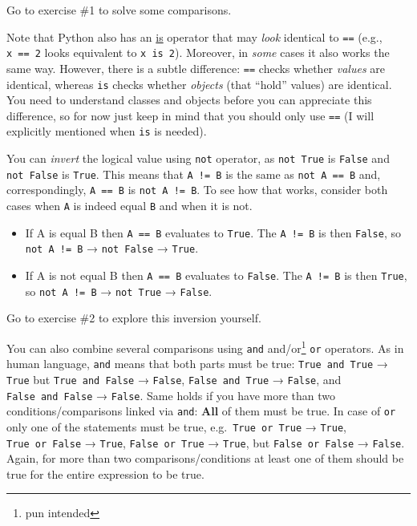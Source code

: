 \documentclass[
]{book}
\providecommand{\tightlist}{%
  \setlength{\itemsep}{0pt}\setlength{\parskip}{0pt}}
\begin{document}
Go to exercise \#1 to solve some comparisons.

Note that Python also has an \href{https://docs.python.org/3/library/operator.html\#operator.is_}{is} operator that may \emph{look} identical to \texttt{==} (e.g., \texttt{x\ ==\ 2} looks equivalent to \texttt{x\ is\ 2}). Moreover, in \emph{some} cases it also works the same way. However, there is a subtle difference: \texttt{==} checks whether \emph{values} are identical, whereas \texttt{is} checks whether \emph{objects} (that ``hold'' values) are identical. You need to understand classes and objects before you can appreciate this difference, so for now just keep in mind that you should only use \texttt{==} (I will explicitly mentioned when \texttt{is} is needed).

You can \emph{invert} the logical value using \texttt{not} operator, as \texttt{not\ True} is \texttt{False} and \texttt{not\ False} is \texttt{True}. This means that \texttt{A\ !=\ B} is the same as \texttt{not\ A\ ==\ B} and, correspondingly, \texttt{A\ ==\ B} is \texttt{not\ A\ !=\ B}. To see how that works, consider both cases when \texttt{A} is indeed equal \texttt{B} and when it is not.

\begin{itemize}
\tightlist
\item
  If A is equal B then \texttt{A\ ==\ B} evaluates to \texttt{True}. The \texttt{A\ !=\ B} is then \texttt{False}, so \texttt{not\ A\ !=\ B} → \texttt{not\ False} → \texttt{True}.
\item
  If A is not equal B then \texttt{A\ ==\ B} evaluates to \texttt{False}. The \texttt{A\ !=\ B} is then \texttt{True}, so \texttt{not\ A\ !=\ B} → \texttt{not\ True} → \texttt{False}.
\end{itemize}

Go to exercise \#2 to explore this inversion yourself.

You can also combine several comparisons using \texttt{and} and/or\footnote{pun intended} \texttt{or} operators. As in human language, \texttt{and} means that both parts must be true: \texttt{True\ and\ True} → \texttt{True} but \texttt{True\ and\ False} → \texttt{False}, \texttt{False\ and\ True} → \texttt{False}, and \texttt{False\ and\ False} → \texttt{False}. Same holds if you have more than two conditions/comparisons linked via \texttt{and}: \textbf{All} of them must be true. In case of \texttt{or} only one of the statements must be true, e.g.~\texttt{True\ or\ True} → \texttt{True}, \texttt{True\ or\ False} → \texttt{True}, \texttt{False\ or\ True} → \texttt{True}, but \texttt{False\ or\ False} → \texttt{False}. Again, for more than two comparisons/conditions at least one of them should be true for the entire expression to be true.
\end{document}
